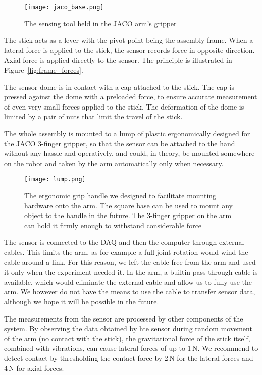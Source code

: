 \documentclass[buriama8_dp.tex]{subfiles}
\begin{document}
\begin{figure}[htp]
  \centering
  \hspace{2cm}\texttt{[image: jaco\_base.png]}
  \caption[Sensing tool]{The sensing tool held in the JACO arm's gripper}
  \label{fig:tool_photo} 
\end{figure}

The stick acts as a lever with the pivot point being the assembly frame. When a lateral force is applied to the stick, the sensor records force in opposite direction. Axial force is applied directly to the sensor. The principle is illustrated in Figure~\ref{fig:frame_forces}.

The sensor dome is in contact with a cap attached to the stick. The cap is pressed against the dome with a preloaded force, to ensure accurate measurement of even very small forces applied to the stick. The deformation of the dome is limited by a pair of nuts that limit the travel of the stick.

The whole assembly is mounted to a lump of plastic ergonomically designed for the JACO 3-finger gripper, so that the sensor can be attached to the hand without any hassle and operatively, and could, in theory, be mounted somewhere on the robot and taken by the arm automatically only when necessary.

\begin{figure}[ht]
  \centering
  \texttt{[image: lump.png]}
  \caption[Tool grip handle]{The ergonomic grip handle we designed to facilitate mounting hardware onto the arm. The square base can be used to mount any object to the handle in the future. The 3-finger gripper on the arm can hold it firmly enough to withstand considerable force}
  \label{fig:label}
\end{figure}

The sensor is connected to the DAQ and then the computer through external cables. This limits the arm, as for example a full joint rotation would wind the cable around a link. For this reason, we left the cable free from the arm and used it only when the experiment needed it. In the arm, a builtin pass-through cable is available, which would eliminate the external cable and allow us to fully use the arm. We however do not have the means to use the cable to transfer sensor data, although we hope it will be possible in the future.

The measurements from the sensor are processed by other components of the system. By observing the data obtained by hte sensor during random movement of the arm (no contact with the stick), the gravitational force of the stick itself, combined with vibrations, can cause lateral forces of up to 1\,N. We recommend to detect contact by thresholding the contact force by 2\,N for the lateral forces and 4\,N for axial forces.
\end{document}
